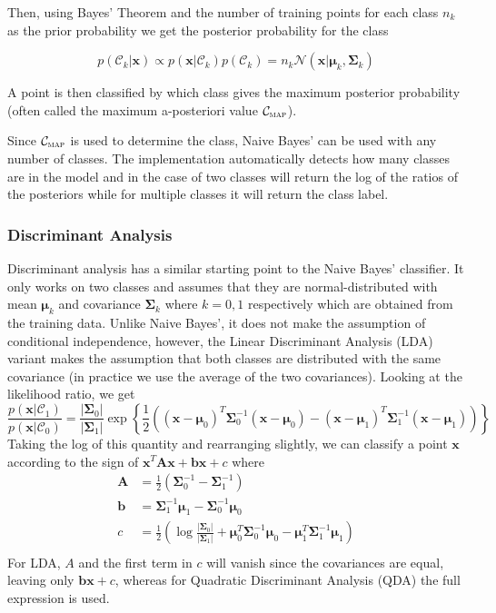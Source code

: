 \documentclass[a4paper]{article}
\begin{document}
Then, using Bayes' Theorem and the number of training points for each class $n_k$ as the prior probability we get the posterior probability for the class

\[ p(\mathcal{C}_k | \mathbf{x}) \propto p(\mathbf{x} | \mathcal{C}_k) p(\mathcal{C}_k) = n_k \mathcal{N}(\mathbf{x} | \bm{\mu}_k, \bm{\Sigma}_k)\]

A point is then classified by which class gives the maximum posterior probability (often called the maximum a-posteriori value $\mathcal{C}_\textsc{map}$).

Since $\mathcal{C}_\textsc{map}$ is used to determine the class, Naive Bayes' can be used with any number of classes. The implementation automatically detects how many classes are in the model and in the case of two classes will return the log of the ratios of the posteriors while for multiple classes it will return the class label.
    
\subsubsection{Discriminant Analysis}
Discriminant analysis has a similar starting point to the Naive Bayes' classifier. It only works on two classes and assumes that they are normal-distributed with mean $\bm{\mu}_k$ and covariance $\bm{\Sigma}_k$ where $k = 0,1$ respectively which are obtained from the training data. Unlike Naive Bayes', it does not make the assumption of conditional independence, however, the Linear Discriminant Analysis (LDA) variant makes the assumption that both classes are distributed with the same covariance (in practice we use the average of the two covariances). Looking at the likelihood ratio, we get
\[ \frac{p(\mathbf{x} | \mathcal{C}_1)}{p(\mathbf{x} | \mathcal{C}_0)} = \frac{|\bm{\Sigma}_0|}{|\bm{\Sigma}_1|} \exp \left\lbrace \frac{1}{2} \left( (\mathbf{x} - \bm{\mu}_0)^T \bm{\Sigma}_0^{-1} (\mathbf{x} - \bm{\mu}_0) - (\mathbf{x} - \bm{\mu}_1)^T \bm{\Sigma}_1^{-1} (\mathbf{x} - \bm{\mu}_1) \right) \right\rbrace \]
Taking the log of this quantity and rearranging slightly, we can classify a point $\mathbf{x}$ according to the sign of $\mathbf{x}^T\mathbf{Ax} + \mathbf{bx} + c$ where
\begin{align*}
\mathbf{A} &= \frac{1}{2} \left(\bm{\Sigma}_0^{-1} - \bm{\Sigma}_1^{-1}\right) \\
\mathbf{b} &= \bm{\Sigma}_1^{-1}\bm{\mu}_1 - \bm{\Sigma}_0^{-1}\bm{\mu}_0 \\
c &= \frac{1}{2} \left( \log\frac{|\bm{\Sigma}_0|}{|\bm{\Sigma}_1|} + \bm{\mu}_0^T\bm{\Sigma}_0^{-1}\bm{\mu}_0 - \bm{\mu}_1^T\bm{\Sigma}_1^{-1}\bm{\mu}_1 \right) \\
\end{align*}
For LDA, $A$ and the first term in $c$ will vanish since the covariances are equal, leaving only $ \mathbf{bx} + c$, whereas for Quadratic Discriminant Analysis (QDA) the full expression is used.
\end{document}
